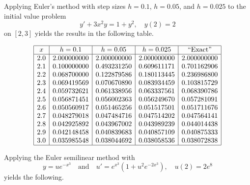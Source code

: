 \documentclass{ximera}
\begin{document}
\begin{example}\label{example:3.1.6}
Applying Euler's method with step sizes $h=0.1$, $h=0.05$, and
$h=0.025$ to  the initial value problem
\begin{equation}\label{eq:3.1.26}
y'+3x^2y=1+y^2,\quad y(2)=2
\end{equation}
on  $[2,3]$ yields the results in the following table. 

$$
\begin{array}{|c|c|c|c|c|}
\hline
x&
h=0.1&
h=0.05&
h=0.025&
\text{``Exact''} \\ \hline
2.0 &2.000000000 & 2.000000000 & 2.000000000 & 2.000000000 \\
2.1 &0.100000000 & 0.493231250 & 0.609611171 & 0.701162906 \\
2.2 &0.068700000 & 0.122879586 & 0.180113445 & 0.236986800 \\
2.3 &0.069419569 & 0.070670890 & 0.083934459 & 0.103815729 \\
2.4 &0.059732621 & 0.061338956 & 0.063337561 & 0.068390786 \\
2.5 &0.056871451 & 0.056002363 & 0.056249670 & 0.057281091 \\
2.6 &0.050560917 & 0.051465256 & 0.051517501 & 0.051711676 \\
2.7 &0.048279018 & 0.047484716 & 0.047514202 & 0.047564141 \\
2.8 &0.042925892 & 0.043967002 & 0.043989239 & 0.044014438 \\
2.9 &0.042148458 & 0.040839683 & 0.040857109 & 0.040875333 \\
3.0 &0.035985548 & 0.038044692 & 0.038058536 & 0.038072838 \\
\hline
\end{array}
$$


Applying the Euler semilinear method with
$$
y=ue^{-x^3}\quad\mbox{and}\quad u'=e^{x^3}(1+u^2e^{-2x^3}),\quad
u(2)=2e^8
$$
yields the following. 


\end{example}
\end{document}

